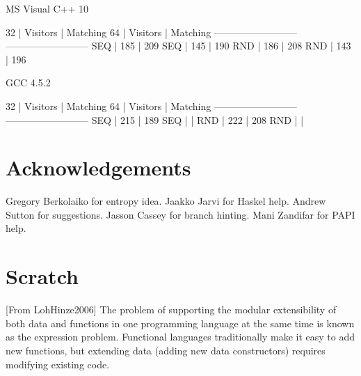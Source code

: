 \documentclass[submission,copyright]{eptcs}
\begin{document}
MS Visual C++ 10

 32 | Visitors | Matching      64 | Visitors | Matching 
--------------------------    --------------------------
SEQ |   185    |   209        SEQ |   145    |   190    
RND |   186    |   208        RND |   143    |   196    

GCC 4.5.2

 32 | Visitors | Matching      64 | Visitors | Matching 
--------------------------    --------------------------
SEQ |   215    |   189        SEQ |          |          
RND |   222    |   208        RND |          |          

\section{Acknowledgements} %

Gregory Berkolaiko for entropy idea. Jaakko Jarvi for Haskel help. Andrew Sutton 
for suggestions. Jasson Cassey for branch hinting. Mani Zandifar for PAPI help.

\section{Scratch}

[From LohHinze2006]
The problem of supporting the modular extensibility of both data
and functions in one programming language at the same time is
known as the expression problem. Functional languages traditionally
make it easy to add new functions, but extending data
(adding new data constructors) requires modifying existing code.
\end{document}
